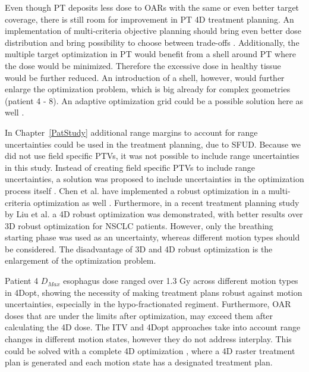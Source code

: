 Even though PT deposits less dose to OARs with the same or even better target coverage, there is still room for improvement in PT 4D treatment planning. 
An implementation of multi-criteria objective planning should bring even better dose distribution and bring possibility to choose between trade-offs \cite{Breedveld2007, Chen2010}. 
Additionally, the multiple target optimization in PT would benefit from a shell around PT where the dose would be minimized. Therefore the excessive dose
in healthy tissue would be further reduced. An introduction of a shell, however, would further enlarge the optimization problem, which is big already for complex geometries 
(patient 4 - 8). An adaptive optimization grid could be a possible solution here as well \cite{Prall2016a}.

In Chapter~\ref{PatStudy} additional range margins to account for range uncertainties could be used in the treatment planning, due to SFUD. 
Because we did not use field specific PTVs, it was not possible to include range uncertainties in this study.
Instead of creating field specific PTVs to include range uncertainties, a solution was proposed to include uncertainties in the optimization process itself \cite{Pflugfelder2008, Unkelbach2009, Fredriksson2011, Chen2012}.
Chen et al. have implemented a robust optimization in a multi-criteria optimization as well \cite{Chen2012}. Furthermore, in a recent treatment planning study by Liu et al. \cite{Liu2016}
a 4D robust optimization was demonstrated, with better results over 3D robust optimization for NSCLC patients. However, only the breathing starting phase was used as an uncertainty,
whereas different motion types should be considered. The disadvantage of 3D and 4D robust optimization is the enlargement of the optimization problem.

Patient 4 $D_{Max}$ esophagus dose ranged over 1.3 Gy across different motion types in 4Dopt, showing the necessity of making treatment plans robust against motion uncertainties, 
especially in the hypo-fractionated regiment. Furthermore, OAR doses that are under the limits after optimization, may exceed them after calculating the 4D dose. 
The ITV and 4Dopt approaches take into account range changes in different motion states, however they do not address interplay. 
This could be solved with a complete 4D optimization \cite{Graeff2013}, where a 4D raster treatment plan is 
generated and each motion state has a designated treatment plan. 


